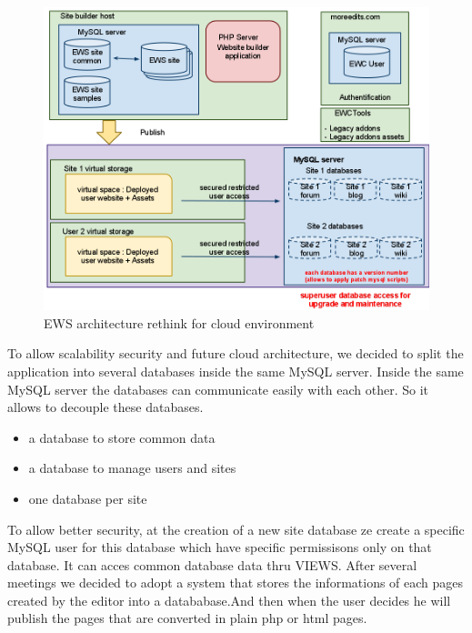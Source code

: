 \begin{figure}[!ht]
\centering
\includegraphics[width=.55\textwidth]{img/ews_archi_after.png}
\caption{EWS architecture rethink for cloud environment}
\label{figure:ews_archi_after}
\end{figure}


To allow scalability security and future cloud architecture, we decided to split the application into several databases inside the same MySQL server. Inside the same MySQL server the databases can communicate easily with each other. So it allows to decouple these databases.
\begin{itemize}
\item a database to store common data
\item a database to manage users and sites
\item one database per site 
\end{itemize}
To allow better security, at the creation of a new site database ze create a specific MySQL user for this database which have specific permissisons only on that database. It can acces common database data thru VIEWS.
After several meetings we decided to adopt a system that stores the informations of each pages created by the editor into a datababase.And then when the user decides he will publish the pages that are converted in plain php or html pages.

